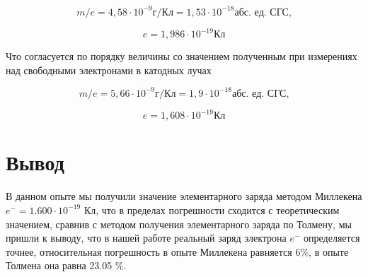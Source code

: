 \documentclass{lab}
\begin{document}
\begin{equation}
    m/e = 4,58 \cdot 10^{-9} \text{г/Кл} = 1,53 \cdot 10^{-18} \text{абс. ед. СГС,}
\end{equation}

\begin{equation}
    e = 1,986\cdot 10^{-19} \text{Кл}
\end{equation}

Что согласуется по порядку величины со значением полученным при измерениях над свободными электронами в катодных лучах

\begin{equation}
    m/e = 5,66 \cdot 10^{-9} \text{г/Кл}  = 1,9 \cdot 10^{-18} \text{абс. ед. СГС,}
\end{equation}

\begin{equation}
    e = 1,608\cdot 10^{-19} \text{Кл}
\end{equation}

\section{Вывод}
В данном опыте мы получили значение элементарного заряда методом Миллекена $e^{-} = 1.600 \cdot10^{-19} \text{ Кл}$, что в пределах погрешности сходится с теоретическим значением, сравнив с методом получения элементарного заряда по Толмену, мы пришли к выводу, что в нашей работе реальный заряд электрона $e^{-}$ определяется точнее, относительная погрешность в опыте Миллекена равняется 6\%, в опыте Толмена она равна 23.05 \%.
\end{document}
